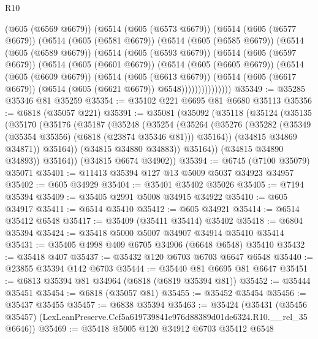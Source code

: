 \begin{lexlean}{R10}
\begin{coremodule}
        (@605 (@6569 @6679))
        (@6514
          (@605 (@6573 @6679))
          (@6514
            (@605 (@6577 @6679))
            (@6514
              (@605 (@6581 @6679))
              (@6514
                (@605 (@6585 @6679))
                (@6514
                  (@605 (@6589 @6679))
                  (@6514
                    (@605 (@6593 @6679))
                    (@6514
                      (@605 (@6597 @6679))
                      (@6514
                        (@605 (@6601 @6679))
                        (@6514
                          (@605 (@6605 @6679))
                          (@6514
                            (@605 (@6609 @6679))
                            (@6514
                              (@605 (@6613 @6679))
                              (@6514
                                (@605 (@6617 @6679))
                                (@6514 (@605 (@6621 @6679)) @6548)))))))))))))))
@35349 := @35285 @35346 @81 @35259
@35354 := @35102 @221 @6695 @81 @6680 @35113
@35356 := @6818 (@35057 @221)
@35391 := @35081
    (@35092
      (@35118
        (@35124
          (@35135
            (@35170
              (@35176
                (@35187
                  (@35248
                    (@35254
                      (@35264
                        (@35276
                          (@35282 (@35349 (@35354 @35356) (@6818 (@23874 @35346 @81))) @35164))
                        (@34815 @34869 @34871))
                      @35164))
                  (@34815 @34880 @34883))
                @35164))
            (@34815 @34890 @34893))
          @35164))
      (@34815 @6674 @34902))
@35394 := @6745 (@7100 @35079) @35071
@35401 := @11413 @35394 @127 @13 @5009 @5037 @34923 @34957
@35402 := @605 @34929
@35404 := @35401 @35402 @35026
@35405 := @7194 @35394
@35409 := @35405 @2991 @5008 @34915 @34922
@35410 := @605 @34917
@35411 := @6514 @35410
@35412 := @605 @34921
@35414 := @6514 @35412 @6548
@35417 := @35409 (@35411 @35414) @35402
@35418 := @6804 @35394
@35424 := @35418 @5000 @5007 @34907 @34914 @35410 @35414
@35431 := @35405 @4998 @409 @6705 @34906 (@6648 @6548) @35410
@35432 := @35418 @407
@35437 := @35432 @120 @6703 @6703 @6647 @6548
@35440 := @23855 @35394 @142 @6703
@35444 := @35440 @81 @6695 @81 @6647
@35451 := @6813 @35394 @81 @34964 (@6818 (@6819 @35394 @81))
@35452 := @35444 @35451
@35454 := @6818 (@35057 @81)
@35455 := @35452 @35454
@35456 := @35437 @35455
@35457 := @6838 @35394
@35463 := @35424
    (@35431 (@35456 @35457) (LexLeanPreserve.Ccf5a619739841e976d88389d01de6324.R10.__rel_35 @6646))
@35469 := @35418 @5005 @120 @34912 @6703 @35412 @6548

\end{coremodule}
\end{lexlean}
